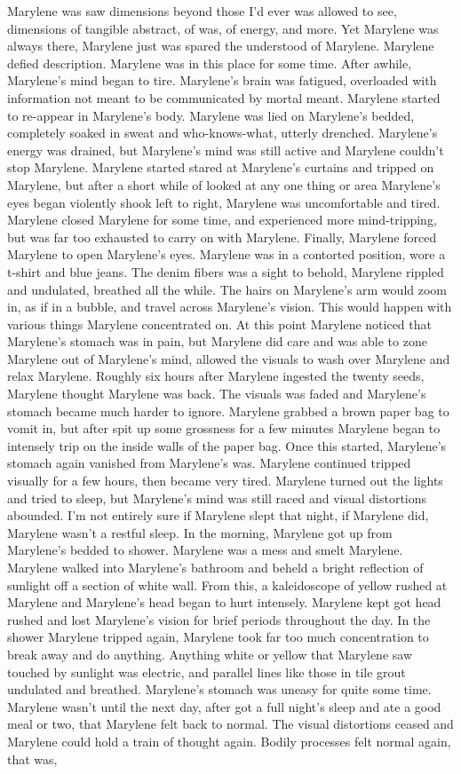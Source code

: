 \documentclass[12pt]{book}
\begin{document}
Marylene was saw dimensions beyond those I'd ever was allowed to see, dimensions of tangible abstract, of was, of energy, and more. Yet Marylene was always there, Marylene just was spared the understood of Marylene. Marylene defied description. Marylene was in this place for some time. After awhile, Marylene's mind began to tire. Marylene's brain was fatigued, overloaded with information not meant to be communicated by mortal meant. Marylene started to re-appear in Marylene's body. Marylene was lied on Marylene's bedded, completely soaked in sweat and who-knows-what, utterly drenched. Marylene's energy was drained, but Marylene's mind was still active and Marylene couldn't stop Marylene. Marylene started stared at Marylene's curtains and tripped on Marylene, but after a short while of looked at any one thing or area Marylene's eyes began violently shook left to right, Marylene was uncomfortable and tired. Marylene closed Marylene for some time, and experienced more mind-tripping, but was far too exhausted to carry on with Marylene. Finally, Marylene forced Marylene to open Marylene's eyes. Marylene was in a contorted position, wore a t-shirt and blue jeans. The denim fibers was a sight to behold, Marylene rippled and undulated, breathed all the while. The hairs on Marylene's arm would zoom in, as if in a bubble, and travel across Marylene's vision. This would happen with various things Marylene concentrated on. At this point Marylene noticed that Marylene's stomach was in pain, but Marylene did care and was able to zone Marylene out of Marylene's mind, allowed the visuals to wash over Marylene and relax Marylene. Roughly six hours after Marylene ingested the twenty seeds, Marylene thought Marylene was back. The visuals was faded and Marylene's stomach became much harder to ignore. Marylene grabbed a brown paper bag to vomit in, but after spit up some grossness for a few minutes Marylene began to intensely trip on the inside walls of the paper bag. Once this started, Marylene's stomach again vanished from Marylene's was. Marylene continued tripped visually for a few hours, then became very tired. Marylene turned out the lights and tried to sleep, but Marylene's mind was still raced and visual distortions abounded. I'm not entirely sure if Marylene slept that night, if Marylene did, Marylene wasn't a restful sleep. In the morning, Marylene got up from Marylene's bedded to shower. Marylene was a mess and smelt Marylene. Marylene walked into Marylene's bathroom and beheld a bright reflection of sunlight off a section of white wall. From this, a kaleidoscope of yellow rushed at Marylene and Marylene's head began to hurt intensely. Marylene kept got head rushed and lost Marylene's vision for brief periods throughout the day. In the shower Marylene tripped again, Marylene took far too much concentration to break away and do anything. Anything white or yellow that Marylene saw touched by sunlight was electric, and parallel lines like those in tile grout undulated and breathed. Marylene's stomach was uneasy for quite some time. Marylene wasn't until the next day, after got a full night's sleep and ate a good meal or two, that Marylene felt back to normal. The visual distortions ceased and Marylene could hold a train of thought again. Bodily processes felt normal again, that was, 
\end{document}
